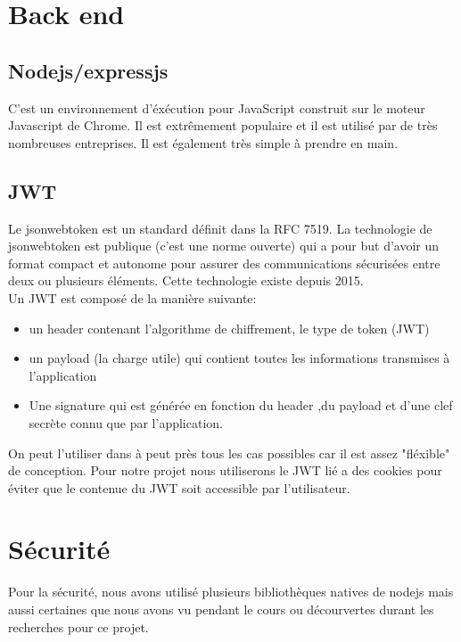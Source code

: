 \documentclass[a4paper,12pt]{report}
\begin{document}
\section{Back end}

\subsection{Nodejs/expressjs}
C'est un environnement d'éxécution pour JavaScript construit sur le moteur Javascript de Chrome. Il est extrêmement populaire et il est utilisé par de très nombreuses entreprises. 
Il est également très simple à prendre en main.

\subsection{JWT}

Le jsonwebtoken est un standard définit dans la RFC 7519. 
La technologie de jsonwebtoken est publique (c'est une norme ouverte) qui a pour but d'avoir un format compact et autonome pour assurer des communications sécurisées entre deux ou plusieurs éléments.
Cette technologie existe depuis 2015.\\
Un JWT est composé de la manière suivante:

\begin{itemize}
\item un header contenant l'algorithme de chiffrement, le type de token (JWT)
\item un payload (la charge utile) qui contient toutes les informations transmises à l'application
\item Une signature qui est générée en fonction du header ,du payload et d'une clef secrète connu que par l'application.\\
\end{itemize}

On peut l'utiliser dans à peut près tous les cas possibles car il est assez "fléxible" de conception. 
Pour notre projet nous utiliserons le JWT lié a des cookies pour éviter que le contenue du JWT soit accessible par l'utilisateur.

\section{Sécurité}
Pour la sécurité, nous avons utilisé plusieurs bibliothèques natives de nodejs mais aussi certaines que nous avons vu pendant le cours ou décourvertes durant les recherches pour ce projet.
\end{document}
